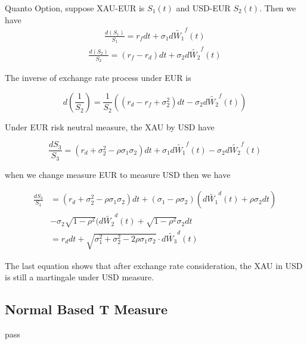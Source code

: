 \documentclass[11pt, oneside]{article}   	%
\begin{document}
\begin{exmp}
Quanto Option, suppose XAU-EUR is $S_1(t)$ and USD-EUR $S_2(t)$. Then we have
\begin{equation}
  \begin{aligned}
  \frac{d(S_1)}{S_1} = r_f dt + \sigma_1 d\widetilde{W_1}^f(t)
  \end{aligned}
\end{equation}
\begin{equation}
  \begin{aligned}
  \frac{d(S_2)}{S_2} = (r_f - r_d) dt + \sigma_2 d\widetilde{W_2}^f(t)
  \end{aligned}
\end{equation}

The inverse of exchange rate process under EUR is

\begin{equation}
d(\frac{1}{S_2}) = \frac{1}{S_2} ( (r_d - r_f + \sigma_2^2) dt - \sigma_2 d\widetilde{W_2}^f(t) )
\end{equation}

Under EUR risk neutral measure, the XAU by USD have

\begin{equation}
\frac{dS_3}{S_3} = (r_d + \sigma_2^2 - \rho\sigma_1\sigma_2) dt  + \sigma_1 d\widetilde{W_1}^f(t) - \sigma_2 d\widetilde{W_2}^f(t)
\end{equation}

when we change measure EUR to measure USD then we have

\begin{equation}
\begin{aligned}
\frac{dS_3}{S_3} &= (r_d + \sigma_2^2 - \rho\sigma_1\sigma_2) dt  + (\sigma_1 - \rho\sigma_2)(d\widetilde{W_1}^d(t) + \rho \sigma_2 dt) \\
                 &- \sigma_2 \sqrt{1 - \rho ^ 2} (d\widetilde{W_2}^d(t) + \sqrt{1 - \rho ^ 2} \sigma_2 dt\\
                 &= r_d dt + \sqrt{\sigma_1^2 + \sigma_2^2 - 2\rho \sigma_1 \sigma_2} \cdot d\widetilde{W_3}^d(t)
\end{aligned}
\end{equation}

The last equation shows that {\color{blue}after exchange rate consideration, the XAU in USD is still a martingale under USD measure.}

\end{exmp}

\subsection{Normal Based T Measure}
pass
\end{document}
